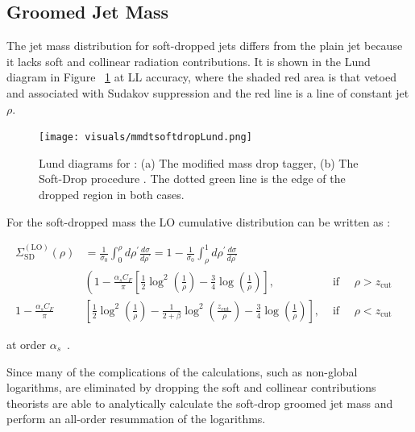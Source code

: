 \subsection{Groomed Jet Mass }\label{sec:jetmassgroomed}

The jet mass distribution for soft-dropped jets differs from the plain jet because it lacks soft and collinear radiation contributions. It is shown in the Lund diagram in Figure ~\ref{fig:mmdtsoftdropLund} at LL accuracy, where the shaded red area is that vetoed and associated with Sudakov suppression and the red line is a line of constant jet $\rho$.

\begin{figure}[htb]
\centering
\texttt{[image: visuals/mmdtsoftdropLund.png]}
\caption{Lund diagrams for : (a) The modified mass drop tagger, (b) The Soft-Drop procedure . The dotted green line is the edge of the dropped region in both cases. }
\label{fig:mmdtsoftdropLund}
\end{figure}

For the soft-dropped mass the LO cumulative distribution can be written as :\newline

\begin{equation}
\begin{aligned} \Sigma_{\mathrm{SD}}^{(\mathrm{LO})}(\rho) &=\frac{1}{\sigma_{0}} \int_{0}^{\rho} d \rho^{\prime} \frac{d \sigma}{d \rho^{\prime}}=1-\frac{1}{\sigma_{0}} \int_{\rho}^{1} d \rho^{\prime} \frac{d \sigma}{d \rho^{\prime}} & & \\ &\left(1-\frac{\alpha_{s} C_{F}}{\pi}\left[\frac{1}{2} \log ^{2}\left(\frac{1}{\rho}\right)-\frac{3}{4} \log \left(\frac{1}{\rho}\right)\right],\right.& \text { if } \quad \rho>z_{\mathrm{cut}} \\ 1-\frac{\alpha_{s} C_{F}}{\pi} &\left[\frac{1}{2} \log ^{2}\left(\frac{1}{\rho}\right)-\frac{1}{2+\beta} \log ^{2}\left(\frac{z_{\text {cut }}}{\rho}\right)-\frac{3}{4} \log \left(\frac{1}{\rho}\right)\right], & \text { if } \quad \rho<z_{\text {cut }} \end{aligned}
\end{equation}

at order $\alpha_s$~\cite{Marzani:2019hun}.

Since many of the complications of the calculations, such as non-global logarithms, are eliminated by dropping the soft and collinear contributions theorists are able to analytically calculate the soft-drop groomed jet mass and perform an all-order resummation of the logarithms.

